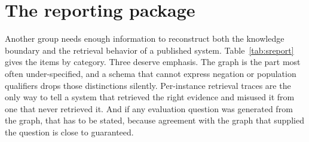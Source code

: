\documentclass[10pt,a4paper]{article}
\begin{document}
\section{The reporting package}
\label{s:artifacts}

Another group needs enough information to reconstruct both the knowledge boundary and the retrieval
behavior of a published system. Table~\ref{tab:sreport} gives the items by category. Three deserve
emphasis. The graph is the part most often under-specified, and a schema that cannot express negation
or population qualifiers drops those distinctions silently. Per-instance retrieval traces are the only way to tell a system that
retrieved the right evidence and misused it from one that never retrieved it. And if any evaluation
question was generated from the graph, that has to be stated, because agreement with the graph that
supplied the question is close to guaranteed.
\end{document}
